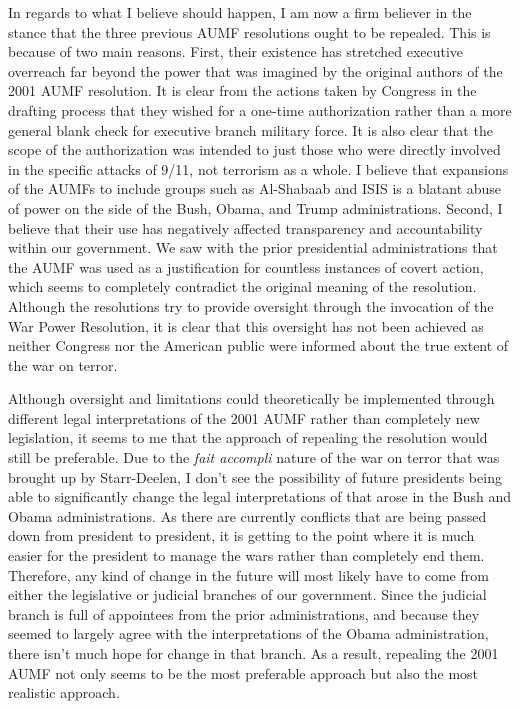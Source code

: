 \documentclass[12pt]{article}
\begin{document}
In regards to what I believe should happen, I am now a firm believer in the stance that the three previous AUMF resolutions ought to be repealed.
This is because of two main reasons.
First, their existence has stretched executive overreach far beyond the power that was imagined by the original authors of the 2001 AUMF resolution.
It is clear from the actions taken by Congress in the drafting process that they wished for a one-time authorization rather than a more general blank check for executive branch military force.
It is also clear that the scope of the authorization was intended to just those who were directly involved in the specific attacks of 9/11, not terrorism as a whole.
I believe that expansions of the AUMFs to include groups such as Al-Shabaab and ISIS is a blatant abuse of power on the side of the Bush, Obama, and Trump administrations.
Second, I believe that their use has negatively affected transparency and accountability within our government.
We saw with the prior presidential administrations that the AUMF was used as a justification for countless instances of covert action, which seems to completely contradict the original meaning of the resolution.
Although the resolutions try to provide oversight through the invocation of the War Power Resolution, it is clear that this oversight has not been achieved as neither Congress nor the American public were informed about the true extent of the war on terror.

Although oversight and limitations could theoretically be implemented through different legal interpretations of the 2001 AUMF rather than completely new legislation, it seems to me that the approach of repealing the resolution would still be preferable.
Due to the \emph{fait accompli} nature of the war on terror that was brought up by Starr-Deelen, I don't see the possibility of future presidents being able to significantly change the legal interpretations of that arose in the Bush and Obama administrations.
As there are currently conflicts that are being passed down from president to president, it is getting to the point where it is much easier for the president to manage the wars rather than completely end them.
Therefore, any kind of change in the future will most likely have to come from either the legislative or judicial branches of our government.
Since the judicial branch is full of appointees from the prior administrations, and because they seemed to largely agree with the interpretations of the Obama administration, there isn't much hope for change in that branch.
As a result, repealing the 2001 AUMF not only seems to be the most preferable approach but also the most realistic approach.
\end{document}
